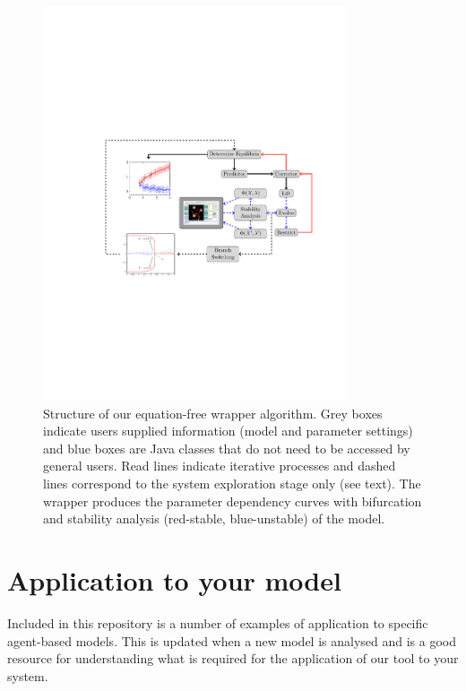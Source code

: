 \documentclass[11pt]{article}
\begin{document}
\begin{figure}[h]
	\centering
	\includegraphics[width=0.8\textwidth, trim=4cm 8.5cm 2cm 9cm, clip=true]{../logo/algorithm}
	\caption{Structure of our equation-free wrapper algorithm. Grey boxes indicate users supplied information (model and parameter settings) and blue boxes are Java classes that do not need to be accessed by general users. Read lines indicate iterative processes and dashed lines correspond to the system exploration stage only (see text). The wrapper produces the parameter dependency curves with bifurcation and stability analysis (red-stable, blue-unstable) of the model.  \label{fig:CODE}}
\end{figure} 

\section{Application to your model}
\label{sec:application}
Included in this repository is a number of examples of application to specific agent-based models. This is updated when a new model is analysed and is a good resource for understanding what is required for the application of our tool to your system.
\end{document}
